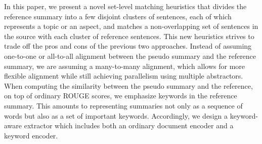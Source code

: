 In this paper, we present a novel set-level matching heuristics
that divides the reference summary into a few disjoint clusters of sentences, 
each of which represents a topic or an aspect, and matches a non-overlapping
set of sentences in the source with each cluster of reference sentences.
This new heuristics strives to trade off the pros and cons of
the previous two approaches. Instead of assuming one-to-one or all-to-all
alignment between the pseudo summary and the reference summary,
we are assuming a many-to-many alignment, which allows for more flexible
alignment while still achieving parallelism using multiple abstractors. 
When computing the similarity between the pseudo summary and the reference,
on top of ordinary ROUGE scores, we emphasize keywords in
the reference summary. This amounts to representing summaries not only as a
sequence of words but also as a set of important keywords.
Accordingly, we design a keyword-aware extractor
which includes both an ordinary document encoder and a keyword encoder. 


